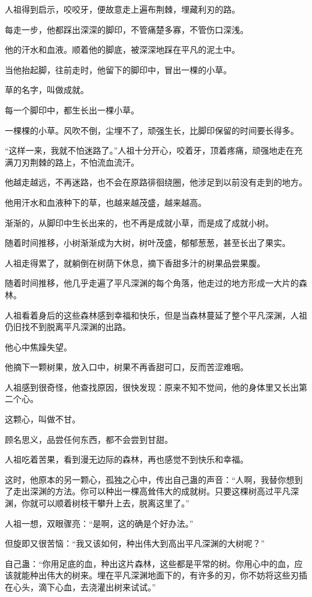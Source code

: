 \begin{this_body}
人祖得到启示，咬咬牙，便故意走上遍布荆棘，埋藏利刃的路。

每走一步，他都踩出深深的脚印，不管痛楚多寡，不管伤口深浅。

他的汗水和血液。顺着他的脚底，被深深地踩在平凡的泥土中。

当他抬起脚，往前走时，他留下的脚印中，冒出一棵的小草。

草的名字，叫做成就。

每一个脚印中，都生长出一棵小草。

一棵棵的小草。风吹不倒，尘埋不了，顽强生长，比脚印保留的时间要长得多。

“这样一来，我就不怕迷路了。”人祖十分开心，咬着牙，顶着疼痛，顽强地走在充满刀刃荆棘的路上，不怕流血流汗。

他越走越远，不再迷路，也不会在原路徘徊绕圈，他涉足到以前没有走到的地方。

他用汗水和血液种下的草，也越来越茂盛，越来越高。

渐渐的，从脚印中生长出来的，也不再是成就小草，而是成了成就小树。

随着时间推移，小树渐渐成为大树，树叶茂盛，郁郁葱葱，甚至长出了果实。

人祖走得累了，就躺倒在树荫下休息，摘下香甜多汁的树果品尝果腹。

随着时间推移，他几乎走遍了平凡深渊的每个角落，他走过的地方形成一大片的森林。

人祖看着身后的这些森林感到幸福和快乐，但是当森林蔓延了整个平凡深渊，人祖仍旧找不到脱离平凡深渊的出路。

他心中焦躁失望。

他摘下一颗树果，放入口中，树果不再香甜可口，反而苦涩难咽。

人祖感到很奇怪，他查找原因，很快发现：原来不知不觉间，他的身体里又长出第二个心。

这颗心，叫做不甘。

顾名思义，品尝任何东西，都不会尝到甘甜。

人祖吃着苦果，看到漫无边际的森林，再也感觉不到快乐和幸福。

这时，他原本的另一颗心，孤独之心中，传出自己蛊的声音：“人啊，我替你想到了走出深渊的方法。你可以种出一棵高耸伟大的成就树。只要这棵树高过平凡深渊，你就可以顺着树枝干攀升上去，脱离这里了。”

人祖一想，双眼骤亮：“是啊，这的确是个好办法。”

但旋即又很苦恼：“我又该如何，种出伟大到高出平凡深渊的大树呢？”

自己蛊：“你用足底的血，种出这片森林，这些都是平常的树。你用心中的血，应该就能种出伟大的树来。埋在平凡深渊地面下的，有许多的刃，你不妨将这些刃插在心头，滴下心血，去浇灌出树来试试。”


\end{this_body}
